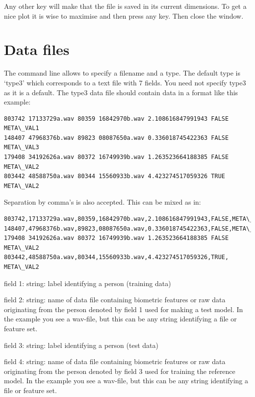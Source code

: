\documentclass[letterpaper,10pt,english]{sphinxmanual}
\begin{document}
Any other key will make that the file is saved in its current dimensions.
To get a nice plot it is wise to maximise and then press any key. Then close
the window.


\chapter{Data files}
\label{index:data-files}
The command line allows to specify a filename and a type. The
default type is `type3' which corresponds to a text file with 7 fields. You need
not specify type3 as it is a default.
The type3 data file should contain data in a format like this example:

\begin{Verbatim}[commandchars=\\\{\}]
803742 17133729a.wav 80359 16842970b.wav 2.108616847991943 FALSE META\_VAL1
148407 47968376b.wav 89823 08087650a.wav 0.336018745422363 FALSE META\_VAL3
179408 34192626a.wav 80372 16749939b.wav 1.263523664188385 FALSE META\_VAL2
803442 48588750a.wav 80344 15560933b.wav 4.423274517059326 TRUE  META\_VAL2
\end{Verbatim}

Separation by comma's is also accepted.
This can be mixed as in:

\begin{Verbatim}[commandchars=\\\{\}]
803742,17133729a.wav,80359,16842970b.wav,2.108616847991943,FALSE,META\_VAL1
148407,47968376b.wav,89823,08087650a.wav,0.336018745422363,FALSE,META\_VAL3
179408 34192626a.wav 80372 16749939b.wav 1.263523664188385 FALSE META\_VAL2
803442,48588750a.wav,80344,15560933b.wav,4.423274517059326,TRUE, META\_VAL2
\end{Verbatim}

field 1: string: label identifying a person (training data)

field 2: string: name of data file containing biometric features or raw data originating from the person denoted by field 1 used for making a test model. In the example you see a wav-file, but this can be any string identifying a file or feature set.

field 3: string: label identifying a person (test data)

field 4: string: name of data file containing biometric features or raw data originating from the person denoted by field 3 used for training the reference model. In the example you see a wav-file, but this can be any string identifying a file or feature set.
\end{document}
